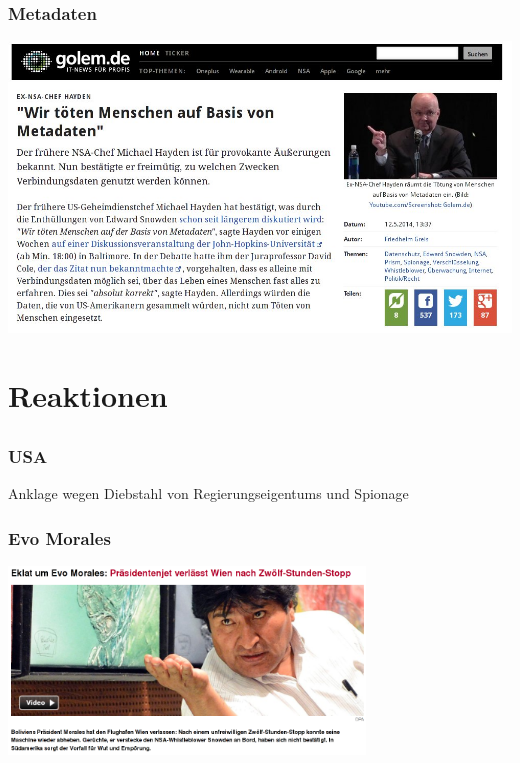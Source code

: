 \documentclass[12pt, xcolor={svgnames,table}]{beamer}
\begin{document}
\begin{frame}
    \frametitle{Metadaten}
    \begin{center}
      \includegraphics[height=0.7\textheight]{img/wekillpeople.jpg}
    \end{center}
\end{frame}

\section{Reaktionen}
\subsection{}

\begin{frame}
  \frametitle{USA}
    \Large Anklage wegen Diebstahl von Regierungseigentums und Spionage
\end{frame}

\begin{frame}
  \frametitle{Evo Morales}
    \begin{center}
      \includegraphics[height=5cm]{img/evomorales.png}
    \end{center}
\end{frame}
\end{document}
